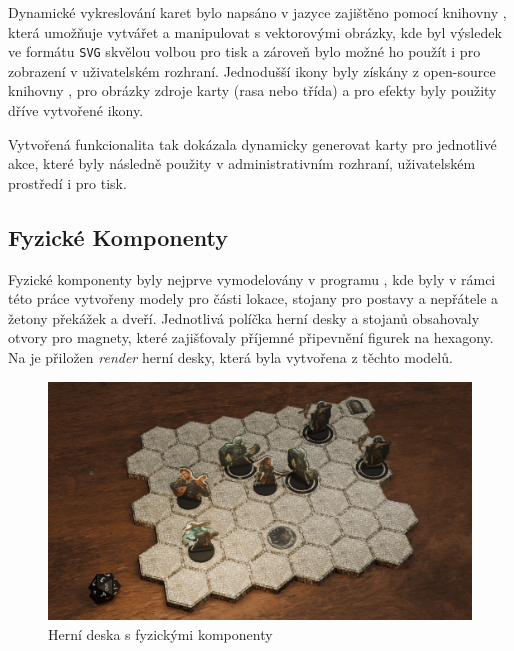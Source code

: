 Dynamické vykreslování karet bylo napsáno v jazyce  zajištěno pomocí knihovny , která umožňuje vytvářet a manipulovat s vektorovými obrázky, kde byl výsledek ve formátu \texttt{SVG} skvělou volbou pro tisk a zároveň bylo možné ho použít i pro zobrazení v uživatelském rozhraní. Jednodušší ikony byly získány z open-source knihovny , pro obrázky zdroje karty (rasa nebo třída) a pro efekty byly použity dříve vytvořené ikony.

Vytvořená funkcionalita tak dokázala dynamicky generovat karty pro jednotlivé akce, které byly následně použity v administrativním rozhraní, uživatelském prostředí i pro tisk.

\subsection{Fyzické Komponenty}
\label{subsec:physical_components}

Fyzické komponenty byly nejprve vymodelovány v programu , kde byly v rámci této práce vytvořeny modely pro části lokace, stojany pro postavy a nepřátele a žetony překážek a dveří. Jednotlivá políčka herní desky a stojanů obsahovaly otvory pro magnety, které zajišťovaly příjemné připevnění figurek na hexagony. Na  je přiložen \textit{render} herní desky, která byla vytvořena z těchto modelů.

\begin{figure}[h]
    \centering
    \includegraphics[width=\textwidth]{figures/images/game.png}
    \caption{Herní deska s fyzickými komponenty}
    \label{fig:game_board}
\end{figure}

